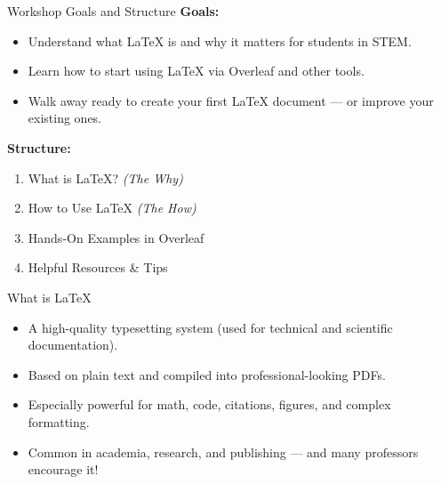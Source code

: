 \documentclass[x11names]{beamer} %
\begin{document}
\begin{frame}{Workshop Goals and Structure}
    \textbf{Goals:}
    \begin{itemize}
        \item Understand what \LaTeX{} is and why it matters for students in STEM.
        \item Learn how to start using \LaTeX{} via Overleaf and other tools.
        \item Walk away ready to create your first LaTeX document — or improve your existing ones.
    \end{itemize}
    \textbf{Structure:}
    \begin{enumerate}
        \item What is \LaTeX{}? \textit{(The Why)}
        \item How to Use \LaTeX{} \textit{(The How)}
        \item Hands-On Examples in Overleaf
        \item Helpful Resources \& Tips
    \end{enumerate}
\end{frame}

\begin{frame}{What is \LaTeX{}} 
\begin{itemize}
    \item A high-quality typesetting system (used for technical and scientific documentation).
    \item Based on plain text and compiled into professional-looking PDFs.
    \item Especially powerful for math, code, citations, figures, and complex formatting.
    \item Common in academia, research, and publishing — and many professors encourage it!
\end{itemize}
\end{frame}
\end{document}
